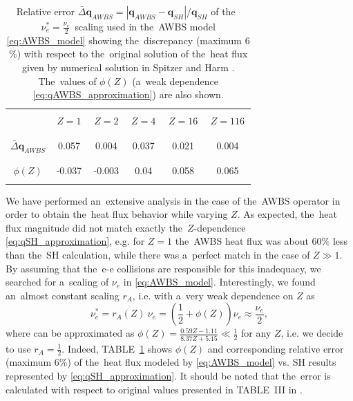 \documentclass[
 aps,
 jmp,
 amsmath,amssymb,
 twocolumn,
]{revtex4-1}
\newcommand{\refeq}[1]{\eqref{#1}}
\newcommand{\tabref}[1]{TABLE~\ref{#1}}
\newcommand{\vect}[1]{\boldsymbol{#1}}
\newcommand{\Zbar}{Z}
\newcommand{\nue}{\nu_{e}}
\begin{document}
\begin{table}
\begin{center}
  \begin{tabular}{c|ccccc}
    \hline\hline\\
    & $\,\Zbar=1\,$ & $\,\Zbar=2\,$ & $\,\Zbar=4\,$ & $\,\Zbar=16\,$ & $\,\Zbar=116\,$ \\\\
    \hline\\
    $\bar{\Delta}\vect{q}_{AWBS}$ & 0.057 & 0.004 & 0.037 & 0.021 & 0.004 \\\\
    \hline\\
    $\phi(\Zbar)$ & -0.037 & -0.003 & 0.04 & 0.058 & 0.065 \\\\ 
    \hline\hline
  \end{tabular}
  \caption{
  Relative error $\bar{\Delta}\vect{q}_{AWBS} = 
  |\vect{q}_{AWBS} - \vect{q}_{SH}| / \vect{q}_{SH}$ of 
  the~$\nue^* = \frac{\nue}{2}$~scaling used in the~AWBS model
  \refeq{eq:AWBS_model} showing the~discrepancy 
  (maximum 6$\%$) with respect to the~original solution of 
  the~heat flux given by numerical solution in Spitzer and Harm 
  \cite{SpitzerHarm_PR1953}. The~values of $\phi(\Zbar)$ (a~weak dependence 
  \eqref{eq:qAWBS_approximation}) are also shown. 
  }
\label{tab:qAWBS}
\end{center}
\end{table}

We have performed an~extensive analysis in the case of 
the~AWBS operator in order to obtain the~heat flux behavior while varying 
$\Zbar$. As expected, the~heat flux magnitude did not match exactly 
the~$\Zbar$-dependence \eqref{eq:qSH_approximation}, e.g. for $\Zbar=1$
the~AWBS heat flux was about 60$\%$ less than the~SH calculation, while
there was a~perfect match in the case of $\Zbar\gg1$. By assuming that the~e-e
collisions are responsible for this inadequacy, we searched for a~scaling of
$\nue$ in \eqref{eq:AWBS_model}. Interestingly, we found an~almost constant
scaling $ r_A$, i.e. with a~very weak dependence on $\Zbar$ as  
\begin{equation}
  \nue^* =  r_A(\Zbar)~\nue 
  = \left(\frac{1}{2} + \phi(\Zbar)\right) \nue \approx \frac{\nue}{2} ,
  \label{eq:qAWBS_approximation}
\end{equation}
where can be approximated as 
$\phi(\Zbar) = \frac{0.59 \Zbar - 1.11}{8.37 \Zbar + 5.15} \ll\frac{1}{2}$ 
for any $\Zbar$, i.e. we decide to use $r_A = \frac{1}{2}$.
Indeed, \tabref{tab:qAWBS} shows $\phi(\Zbar)$ and corresponding relative
error (maximum 6$\%$) of the~heat flux modeled by 
\eqref{eq:AWBS_model} vs. SH results represented by 
\eqref{eq:qSH_approximation}. It should be noted that the~error is calculated 
with respect to original values presented in TABLE~III in 
\cite{SpitzerHarm_PR1953}.  
 
\end{document}
